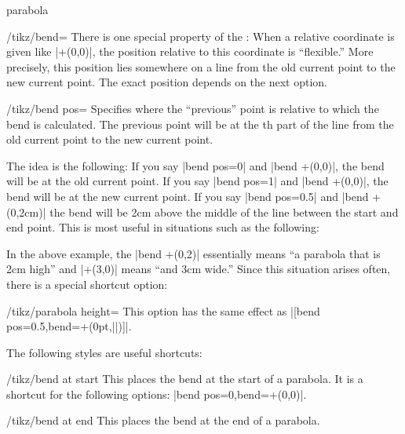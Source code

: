 \begin{pathoperation}{parabola}{}
\begin{key}{/tikz/bend=}
  There is one special property of the : When a
  relative coordinate is given like |+(0,0)|, the position relative
  to this coordinate is ``flexible.'' More precisely, this
  position lies somewhere on a line from the old current point to the
  new current point. The exact position depends on the next
  option.
\end{key}

\begin{key}{/tikz/bend pos=}
  Specifies where the ``previous'' point is relative to which the bend
  is calculated. The previous point will be at the th
  part of the line from the old current point to the new current
  point.

  The idea is the following: If you say |bend pos=0| and
  |bend +(0,0)|, the bend will be at the old current point. If you say
  |bend pos=1| and |bend +(0,0)|, the bend will be at the new current
  point. If you say |bend pos=0.5| and |bend +(0,2cm)| the bend will
  be 2cm above the middle of the line between the start and end
  point. This is most useful in situations such as the following:
\begin{codeexample}[]
\end{codeexample}

  In the above example, the |bend +(0,2)| essentially means ``a
  parabola that is 2cm high'' and |+(3,0)| means ``and 3cm wide.''
  Since this situation arises often, there is a special shortcut
  option:
  \begin{key}{/tikz/parabola height=}
    This option has the same effect as
    |[bend pos=0.5,bend={+(0pt,||)}]|.
\begin{codeexample}[]
\end{codeexample}
  \end{key}
\end{key}

The following styles are useful shortcuts:
\begin{stylekey}{/tikz/bend at start}
  This places the bend at the start of a
  parabola. It is a shortcut for the following options:
  |bend pos=0,bend={+(0,0)}|.
\end{stylekey}

\begin{stylekey}{/tikz/bend at end}
  This places the bend at the end of a parabola.
\end{stylekey}

\end{pathoperation}


